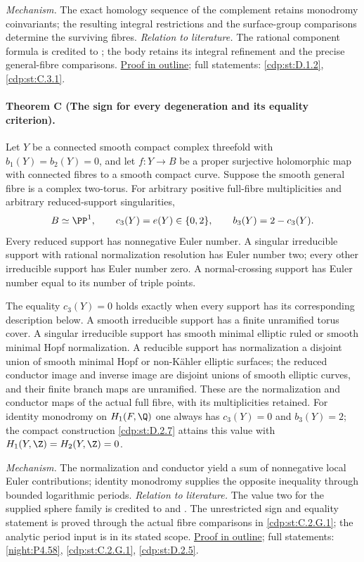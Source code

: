 \textit{Mechanism.} The exact homology sequence of the complement
retains monodromy coinvariants; the resulting integral restrictions
and the surface-group comparisons determine the surviving fibres.
\textit{Relation to literature.} The rational component formula is
credited to \cite[\S10.5, p.~91]{AC2026}; the body retains its
integral refinement and the precise general-fibre comparisons.
\hyperlink{outline-II-B}{Proof in outline}; full statements:
\ref{cdp:st:D.1.2}, \ref{cdp:st:C.3.1}.

\hypertarget{main-II-C}{}
\paragraph{Theorem C (The sign for every degeneration and its equality criterion).}
\label{series:II:C}
Let $Y$ be a connected smooth compact complex threefold with
$b_1(Y)=b_2(Y)=0$, and let $f:Y\to B$ be a proper surjective
holomorphic map with connected fibres to a smooth compact curve.
Suppose the smooth general fibre is a complex two-torus. For
arbitrary positive full-fibre multiplicities and arbitrary
reduced-support singularities,
\[
 B\simeq\PP^1,\qquad
 c_3(Y)=e(Y)\in\{0,2\},\qquad b_3(Y)=2-c_3(Y).
\]
Every reduced support has nonnegative Euler number. A singular
irreducible support with rational normalization resolution has
Euler number two; every other irreducible support has Euler
number zero. A normal-crossing support has Euler number equal
to its number of triple points.

The equality $c_3(Y)=0$ holds exactly when every support has its
corresponding description below. A smooth irreducible support
has a finite unramified torus cover. A singular irreducible support
has smooth minimal elliptic ruled or smooth minimal Hopf
normalization. A reducible support has normalization a disjoint
union of smooth minimal Hopf or non-K\"ahler elliptic surfaces;
the reduced conductor image and inverse image are disjoint unions
of smooth elliptic curves, and their finite branch maps are
unramified. These are the normalization and conductor maps of
the actual full fibre, with its multiplicities retained.
For identity monodromy on $H_1(F,\Q)$ one always has
$c_3(Y)=0$ and $b_3(Y)=2$; the compact construction
\ref{cdp:st:D.2.7} attains this value with
$H_1(Y,\Z)=H_2(Y,\Z)=0$.

\textit{Mechanism.} The normalization and conductor yield a sum of
nonnegative local Euler contributions; identity monodromy supplies
the opposite inequality through bounded logarithmic periods.
\textit{Relation to literature.} The value two for the supplied
sphere family is credited to \cite[Theorem~7.22, p.~60]{AC26}
and \cite[Proposition~7.1]{Engel2026}. The unrestricted sign and
equality statement is proved through the actual fibre comparisons
in \ref{cdp:st:C.2.G.1}; the analytic period input is
\cite[\S2, pp.~234--239]{Steenbrink1976} in its stated scope.
\hyperlink{outline-II-C}{Proof in outline}; full statements:
\ref{night:P4.58}, \ref{cdp:st:C.2.G.1}, \ref{cdp:st:D.2.5}.

